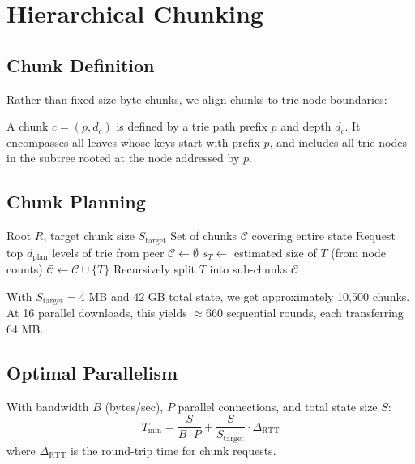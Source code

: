 \section{Hierarchical Chunking}
\label{sec:chunking}

\subsection{Chunk Definition}

Rather than fixed-size byte chunks, we align chunks to trie node boundaries:

\begin{definition}
A chunk $c = (p, d_c)$ is defined by a trie path prefix $p$ and depth $d_c$. It encompasses all leaves whose keys start with prefix $p$, and includes all trie nodes in the subtree rooted at the node addressed by $p$.
\end{definition}

\subsection{Chunk Planning}

\begin{algorithm}[H]
\caption{Hierarchical Chunk Planning}
\label{alg:plan}
\begin{algorithmic}[1]
\Require Root $R$, target chunk size $S_{\text{target}}$
\Ensure Set of chunks $\mathcal{C}$ covering entire state
\State Request top $d_{\text{plan}}$ levels of trie from peer
\State $\mathcal{C} \gets \emptyset$
    \State $s_T \gets$ estimated size of $T$ (from node counts)
        \State $\mathcal{C} \gets \mathcal{C} \cup \{T\}$ 
    \Else
        \State Recursively split $T$ into sub-chunks
    \EndIf
\EndFor
\State \Return $\mathcal{C}$
\end{algorithmic}
\end{algorithm}

With $S_{\text{target}} = 4$ MB and 42 GB total state, we get approximately 10,500 chunks. At 16 parallel downloads, this yields $\approx 660$ sequential rounds, each transferring 64 MB.

\subsection{Optimal Parallelism}

\begin{proposition}
With bandwidth $B$ (bytes/sec), $P$ parallel connections, and total state size $S$:
\begin{equation}
    T_{\min} = \frac{S}{B \cdot P} + \frac{S}{S_{\text{target}}} \cdot \Delta_{\text{RTT}}
\end{equation}
where $\Delta_{\text{RTT}}$ is the round-trip time for chunk requests.
\end{proposition}

